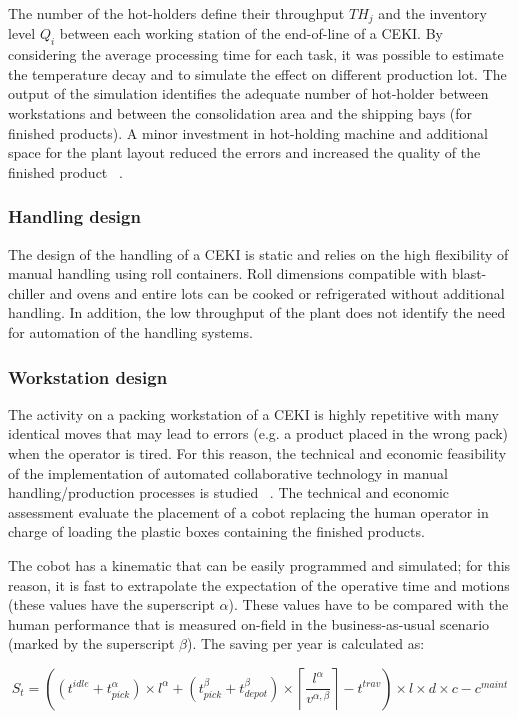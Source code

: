 The number of the hot-holders define their throughput $TH_j$ and the inventory level $Q_i$ between each working station of the end-of-line of a CEKI. By considering the average processing time for each task, it was possible to estimate the temperature decay and to simulate the effect on different production lot. The output of the simulation identifies the adequate number of hot-holder between workstations and between the consolidation area and the shipping bays (for finished products). A minor investment in hot-holding machine and additional space for the plant layout reduced the errors and increased the quality of the finished product ~\cite{Tufano2020}.

\subsubsection{Handling design}
The design of the handling of a CEKI is static and relies on the high flexibility of manual handling using roll containers. Roll dimensions compatible with blast-chiller and ovens and entire lots can be cooked or refrigerated without additional handling. In addition, the low throughput of the plant does not identify the need for automation of the handling systems.

\subsubsection{Workstation design}
The activity on a packing workstation of a CEKI is highly repetitive with many identical moves that may lead to errors (e.g. a product placed in the wrong pack) when the operator is tired. For this reason, the technical and economic feasibility of the implementation of automated collaborative technology in manual handling/production processes is studied ~\cite{Accorsi2019_cobot}. The technical and economic assessment evaluate the placement of a cobot replacing the human operator in charge of loading the plastic boxes containing the finished products.\par

The cobot has a kinematic that can be easily programmed and simulated; for this reason, it is fast to extrapolate the expectation of the operative time and motions (these values have the superscript $\alpha$). These values have to be compared with the human performance that is measured on-field in the business-as-usual scenario (marked by the superscript $\beta$). The saving per year is calculated as:

\begin{equation}
    S_t=\left(\left(t^{idle}+t_{pick}^\alpha\right)\times l^\alpha+\left(t_{pick}^\beta+t_{depot}^\beta\right)\times\left\lceil\frac{l^\alpha}{v^{\alpha,\beta}}\right\rceil-t^{trav}\right)\times l\times d\times c-c^{maint}
\end{equation}

